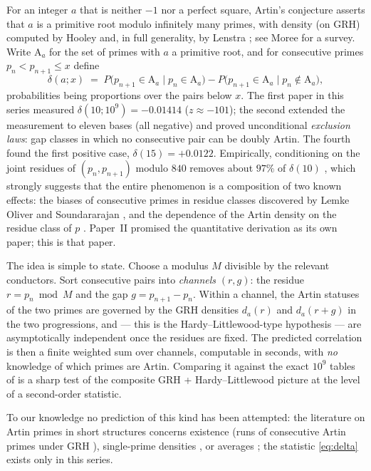 \documentclass[11pt,reqno]{amsart}
\theoremstyle{plain}
\theoremstyle{definition}
\newcommand{\Art}{\mathrm{A}}
\newcommand{\dA}{d_a}
\begin{document}
For an integer $a$ that is neither $-1$ nor a perfect square, Artin's
conjecture asserts that $a$ is a primitive root modulo infinitely many primes,
with density (on GRH) computed by Hooley \cite{Hooley1967} and, in full
generality, by Lenstra \cite{Lenstra1977}; see Moree \cite{Moree2012} for a
survey. Write $\Art_a$ for the set of primes with $a$ a primitive root, and
for consecutive primes $p_n < p_{n+1} \le x$ define
\begin{equation}\label{eq:delta}
\delta(a; x) \;=\;
P\bigl(p_{n+1} \in \Art_a \mid p_n \in \Art_a\bigr)
- P\bigl(p_{n+1} \in \Art_a \mid p_n \notin \Art_a\bigr),
\end{equation}
probabilities being proportions over the pairs below $x$. The first paper in
this series \cite{BaldI} measured $\delta(10; 10^9) = -0.01414$
($z \approx -101$); the second \cite{BaldII} extended the measurement to
eleven bases (all negative) and proved unconditional \emph{exclusion laws}:
gap classes in which no consecutive pair can be doubly Artin. The fourth
\cite{BaldIV} found the first positive case, $\delta(15) = +0.0122$.
Empirically, conditioning on the joint residues of $(p_n, p_{n+1})$ modulo
$840$ removes about $97\%$ of $\delta(10)$ \cite{BaldI}, which strongly
suggests that the entire phenomenon is a composition of two known effects:
the biases of consecutive primes in residue classes discovered by Lemke
Oliver and Soundararajan \cite{LOS2016}, and the dependence of the Artin
density on the residue class of $p$ \cite{Hooley1967, Lenstra1977, Moree2012}.
Paper~II promised the quantitative derivation as its own paper; this is that
paper.

The idea is simple to state. Choose a modulus $M$ divisible by the relevant
conductors. Sort consecutive pairs into \emph{channels} $(r, g)$: the residue
$r = p_n \bmod M$ and the gap $g = p_{n+1} - p_n$. Within a channel, the
Artin statuses of the two primes are governed by the GRH densities
$\dA(r)$ and $\dA(r+g)$ in the two progressions, and --- this is the
Hardy--Littlewood-type hypothesis --- are asymptotically independent once the
residues are fixed. The predicted correlation is then a finite weighted sum
over channels, computable in seconds, with \emph{no} knowledge of which
primes are Artin. Comparing it against the exact $10^9$ tables of
\cite{BaldI, BaldII, BaldIV} is a sharp test of the composite
GRH + Hardy--Littlewood picture at the level of a second-order statistic.

To our knowledge no prediction of this kind has been attempted: the
literature on Artin primes in short structures concerns existence (runs of
consecutive Artin primes under GRH \cite{Pollack2014, BakerPollack2016}),
single-prime densities \cite{Hooley1967, Lenstra1977, Matthews1976,
Kimmel2024, KST2025}, or averages \cite{KST2025}; the statistic
\eqref{eq:delta} exists only in this series.
\end{document}
